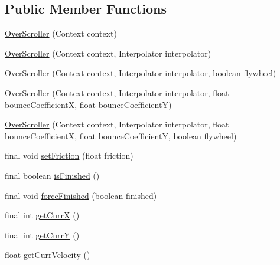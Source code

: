 \subsection*{Public Member Functions}
\begin{DoxyCompactItemize}
\item 
\hyperlink{classit_1_1sephiroth_1_1android_1_1library_1_1widget_1_1_over_scroller_a246d2e5b119127b1cdbc6d095fbde1b2}{Over\+Scroller} (Context context)
\item 
\hyperlink{classit_1_1sephiroth_1_1android_1_1library_1_1widget_1_1_over_scroller_a2926a5ae17a16b1fad96bb0ef83d3225}{Over\+Scroller} (Context context, Interpolator interpolator)
\item 
\hyperlink{classit_1_1sephiroth_1_1android_1_1library_1_1widget_1_1_over_scroller_a86d58509405d1f077f9df1d8ff6dc196}{Over\+Scroller} (Context context, Interpolator interpolator, boolean flywheel)
\item 
\hyperlink{classit_1_1sephiroth_1_1android_1_1library_1_1widget_1_1_over_scroller_a3fe32d4e52bc94a3963ca6024cc980b4}{Over\+Scroller} (Context context, Interpolator interpolator, float bounce\+CoefficientX, float bounce\+CoefficientY)
\item 
\hyperlink{classit_1_1sephiroth_1_1android_1_1library_1_1widget_1_1_over_scroller_a1b1c483fe9d0cccf60f35c51f1628558}{Over\+Scroller} (Context context, Interpolator interpolator, float bounce\+CoefficientX, float bounce\+CoefficientY, boolean flywheel)
\item 
final void \hyperlink{classit_1_1sephiroth_1_1android_1_1library_1_1widget_1_1_over_scroller_aa13283e67a913e82e6e80d87e1a3ae3c}{set\+Friction} (float friction)
\item 
final boolean \hyperlink{classit_1_1sephiroth_1_1android_1_1library_1_1widget_1_1_over_scroller_a49876613bda22ce9d539a61c3056c00f}{is\+Finished} ()
\item 
final void \hyperlink{classit_1_1sephiroth_1_1android_1_1library_1_1widget_1_1_over_scroller_a9855d94ecbdd247fe61b7d1544e5f97e}{force\+Finished} (boolean finished)
\item 
final int \hyperlink{classit_1_1sephiroth_1_1android_1_1library_1_1widget_1_1_over_scroller_a1a24d8c79ec65054c25f3e691e6b61fd}{get\+CurrX} ()
\item 
final int \hyperlink{classit_1_1sephiroth_1_1android_1_1library_1_1widget_1_1_over_scroller_a0f11f8dd921169217adb15f679712fa3}{get\+CurrY} ()
\item 
float \hyperlink{classit_1_1sephiroth_1_1android_1_1library_1_1widget_1_1_over_scroller_a600fe3b88690cc20248e7ab2379f4015}{get\+Curr\+Velocity} ()

\end{DoxyCompactItemize}
